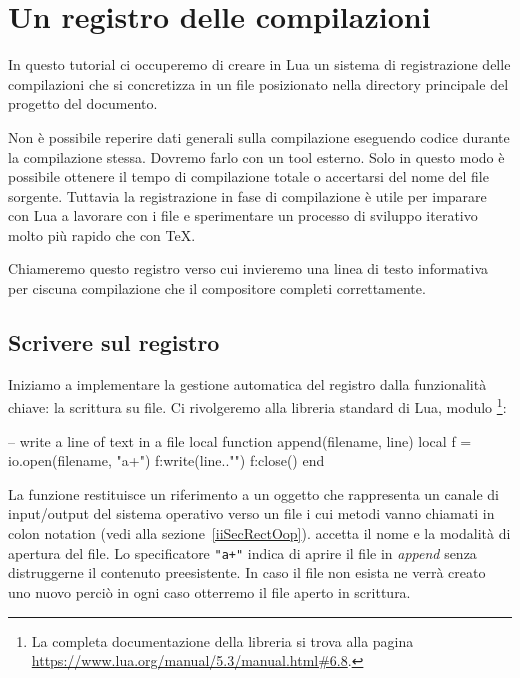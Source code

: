 

\chapter{Un registro delle compilazioni}
\label{iiiChRegistro}

In questo tutorial ci occuperemo di creare in Lua un sistema di registrazione
delle compilazioni che si concretizza in un file posizionato nella directory
principale del progetto del documento.

Non è possibile reperire dati generali sulla compilazione eseguendo codice
durante la compilazione stessa. Dovremo farlo con un tool esterno. Solo in
questo modo è possibile ottenere il tempo di compilazione totale o accertarsi
del nome del file sorgente. Tuttavia la registrazione in fase di compilazione è
utile per imparare con Lua a lavorare con i file e sperimentare un processo di
sviluppo iterativo molto più rapido che con \TeX.

Chiameremo questo registro  verso cui invieremo una linea di
testo informativa per ciscuna compilazione che il compositore completi
correttamente.


\section{Scrivere sul registro}

Iniziamo a implementare la gestione automatica del registro dalla funzionalità
chiave: la scrittura su file. Ci rivolgeremo alla libreria standard di Lua,
modulo \footnote{La completa documentazione della libreria  si
trova alla pagina \url{https://www.lua.org/manual/5.3/manual.html\#6.8}.}:
\begin{lines}
-- write a line of text in a file
local function append(filename, line)
    local f = io.open(filename, "a+")
    f:write(line.."\n")
    f:close()
end
\end{lines}

La funzione  restituisce un riferimento a un oggetto che rappresenta
un canale di input/output del sistema operativo verso un file i cui metodi vanno
chiamati in colon notation (vedi alla sezione~\ref{iiSecRectOop}). 
accetta il nome e la modalità di apertura del file. Lo specificatore \verb|"a+"|
indica di aprire il file in \emph{append} senza distruggerne il contenuto
preesistente. In caso il file non esista ne verrà creato uno nuovo perciò in
ogni caso otterremo il file aperto in scrittura.

